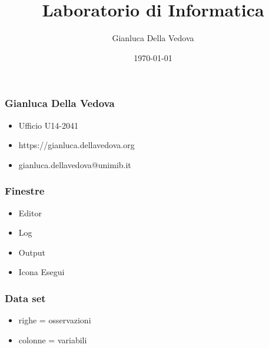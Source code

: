 \documentclass[12pt]{beamer}
\author{Gianluca Della Vedova}
\title{Laboratorio di Informatica}
\institute{Univ. Milano--Bicocca\\
  \texttt{https://gianluca.dellavedova.org}}
\date{\today}
\begin{document}
\begin{frame}
  \titlepage
\end{frame}


\begin{frame}\frametitle{Gianluca Della Vedova}
  \begin{itemize}
  \item
    Ufficio U14-2041
  \item
    \textsf{\small https://gianluca.dellavedova.org}
  \item
    \textsf{\small gianluca.dellavedova@unimib.it}
  \end{itemize}
\end{frame}





\begin{frame}\frametitle{Finestre}
  \begin{itemize}
  \item
    Editor
  \item
    Log
  \item
    Output
  \item
    Icona Esegui
  \end{itemize}
\end{frame}

\begin{frame}\frametitle{Data set}
  \begin{itemize}
  \item
    righe = osservazioni
  \item
    colonne = variabili
  \end{itemize}
\end{frame}
\end{document}

